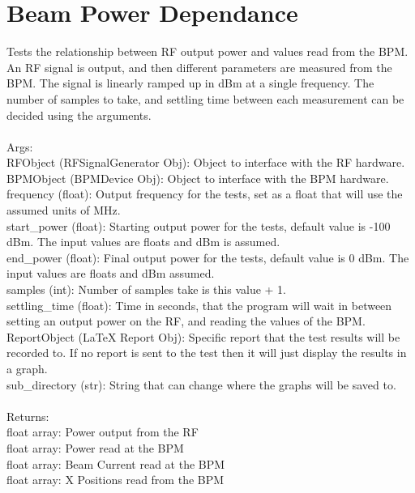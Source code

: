 \documentclass[a4paper, 11pt]{article}%
\begin{document}
%
\clearpage%
\section{Beam Power Dependance}%
Tests the relationship between RF output power and values read from the BPM. 
    An RF signal is output, and then different parameters are measured from the BPM. 
    The signal is linearly ramped up in dBm at a single frequency. The number of samples to take, 
    and settling time between each measurement can be decided using the arguments. \\~\\
    Args:\\
        RFObject (RFSignalGenerator Obj): Object to interface with the RF hardware.\\
        BPMObject (BPMDevice Obj): Object to interface with the BPM hardware.\\
        frequency (float): Output frequency for the tests, set as a float that will 
            use the assumed units of MHz. \\
        start\_power (float): Starting output power for the tests, default value is 
            -100 dBm. The input values are floats and dBm is assumed. \\
        end\_power (float): Final output power for the tests, default value is 0 dBm.
            The input values are floats and dBm assumed. \\
        samples (int): Number of samples take is this value + 1.\\
        settling\_time (float): Time in seconds, that the program will wait in between 
            setting an  output power on the RF, and reading the values of the BPM. \\
        ReportObject (LaTeX Report Obj): Specific report that the test results will be recorded 
            to. If no report is sent to the test then it will just display the results in 
            a graph. \\
        sub\_directory (str): String that can change where the graphs will be saved to.\\~\\
    Returns:\\
        float array: Power output from the RF\\
        float array: Power read at the BPM\\
        float array: Beam Current read at the BPM\\
        float array: X Positions read from the BPM\\
\end{document}
